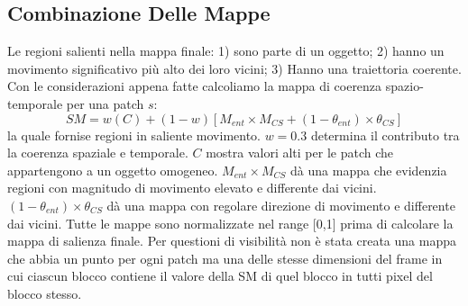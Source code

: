 \documentclass[12pt,twocolumn]{IEEEtran}
\begin{document}
		\subsection{Combinazione Delle Mappe}
			Le regioni salienti nella mappa finale: 1) sono parte di un oggetto; 2) hanno un movimento significativo più alto dei loro vicini; 3) Hanno una traiettoria coerente. Con le considerazioni appena fatte calcoliamo la mappa di coerenza spazio-temporale per una patch $s$:
			\begin{equation}
			SM = w(C)+(1-w)[M_{ent} \times M_{CS}+(1-\theta_{ent})\times\theta_{CS}]
			\end{equation}
			la quale fornise regioni in saliente movimento. $w = 0.3$ determina il contributo tra la coerenza spaziale e temporale. $C$ mostra valori alti per le patch che appartengono a un oggetto omogeneo. $M_{ent} \times M_{CS}$ dà una mappa che evidenzia regioni con magnitudo di movimento elevato e differente dai vicini. $(1-\theta_{ent})\times\theta_{CS}$ dà una mappa con regolare direzione di movimento e differente dai vicini. Tutte le mappe sono normalizzate nel range [0,1] prima di calcolare la mappa di salienza finale.\newline
			Per questioni di visibilità non è stata creata una mappa che abbia un punto per ogni patch ma una delle stesse dimensioni del frame in cui ciascun blocco contiene il valore della SM di quel blocco in tutti pixel del blocco stesso.
\end{document}
